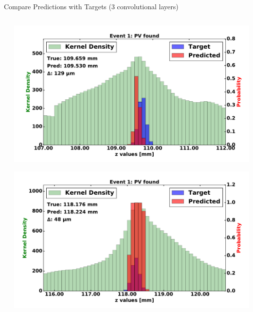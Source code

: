 \begin{frame}{Compare Predictions with Targets (3 convolutional layers)}
\begin{columns}[c]
\begin{center}
        \end{center}
        \begin{center}
           \includegraphics[width=1\textwidth, height=0.45\textwidth, trim=18 0 18 0]{images/120000_3layer_06.pdf}

           \includegraphics[width=1\textwidth, height=0.45\textwidth, trim=18 0 18 0]{images/120000_3layer_07.pdf}
       \end{center}
  \end{columns}
\end{frame}


